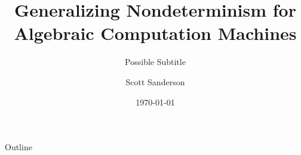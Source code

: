 \documentclass[c]{beamer}
\title{Generalizing Nondeterminism for Algebraic Computation Machines}
\subtitle{Possible Subtitle}
\author{Scott Sanderson}
\institute{Department of Mathematics\\Williams College}
\date{\today}
\begin{document}
\theoremstyle{definition}
\newtheorem{proposition}{Proposition}
\newtheorem{proofidea}{Proof Idea}

\begin{frame}
  \titlepage
\end{frame}

\begin{frame}{Outline}
  \begin{center}
    \scaletopagewidth{\outline}
  \end{center}
\end{frame}

  


  
  



\end{document}
